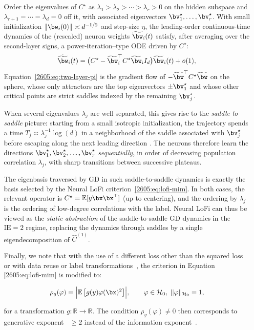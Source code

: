             Order the eigenvalues of $C^\star$ as $\lambda_1>\lambda_2>\cdots>\lambda_r>0$ on the hidden subspace and $\lambda_{r+1}=\cdots=\lambda_d=0$ off it, with associated eigenvectors $\bv^\star_1,\dots,\bv^\star_r$. With small initialization $\|\bw_i(0)\|\asymp d^{-1/2}$ and step-size $\eta$, the leading-order continuous-time dynamics of the (rescaled) neuron weights $\widetilde\bw_i(t)$ satisfy, after averaging over the second-layer signs, a power-iteration--type ODE driven by $C^\star$:
            \begin{equation}\label{2605:eq:two-layer-pi}
            \dot{\widetilde\bw}_i(t)
             = 
            \bigl(C^\star - \widetilde\bw_i^\top C^\star \widetilde\bw_i I_d\bigr) \widetilde\bw_i(t) + o(1),
            \end{equation}
            Equation~\eqref{2605:eq:two-layer-pi} is the gradient flow of $-\widetilde\bw^\top C^\star \widetilde\bw$ on the sphere, whose only attractors are the top eigenvectors $\pm\bv^\star_1$ and whose other critical points are strict saddles indexed by the remaining $\bv^\star_j$.

            When several eigenvalues $\lambda_j$ are well separated, this gives rise to the \emph{saddle-to-saddle} picture: starting from a small isotropic initialization, the trajectory spends a time $T_j\asymp \lambda_j^{-1}\log(d)$ in a neighborhood of the saddle associated with $\bv^\star_j$ before escaping along the next leading direction \cite{arous2026learning}. The neurons therefore learn the directions $\bv^\star_1,\bv^\star_2,\dots,\bv^\star_r$ \emph{sequentially}, in order of decreasing population correlation $\lambda_j$, with sharp transitions between successive plateaus.

            The eigenbasis traversed by GD in such saddle-to-saddle dynamics is exactly the basis selected by the Neural LoFi criterion~\eqref{2605:eq:lofi-mim}. In both cases, the relevant operator is $C^\star=\mathbb{E}[y \bx\bx^\top]$ (up to centering), and the ordering by $\lambda_j$ is the ordering of low-degree correlations with the label. Neural LoFi can thus be viewed as the \emph{static abstraction} of the saddle-to-saddle GD dynamics in the $\mathrm{IE}=2$ regime, replacing the dynamics through saddles by a single eigendecomposition of $\hat C^{(1)}$.

            
Finally, we note that with the use of a different loss other than the squared loss or with data reuse or label transformations~\cite{damian2024computational,damian2026generative}, the criterion in Equation \ref{2605:eq:lofi-mim} is modified to:

\begin{equation}\label{2605:eq:lofi-mim-gen}
\rho_g(\varphi)
 = 
\Bigl| \mathbb{E} \left[g(y) \varphi(\bx)^2\right]\Bigr|,
\qquad
\varphi\in\mathcal{H}_0,\ \|\varphi\|_{\mathcal{H}_0}=1,
\end{equation}

for a transformation $g:\mathbb{R}\rightarrow\mathbb{R}$. The condition $\rho_g(\varphi)\neq 0$ then corresponds to generative exponent~\cite{damian2026generative,arous2021online} $\geq 2$ instead of the information exponent~\cite{benarous2024stochastic}.
